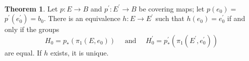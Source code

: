 \documentclass[12pt,a4paper]{book}
\newenvironment{prooff}{{\noindent\it\textcolor{cyan!40!black}{Proof}:}\,}{\par}
\theoremstyle{definition}
\newtheorem{theo}[defn]{Theorem}
\begin{document}
\begin{prooff}



\end{prooff}
\begin{theo}
    Let $p: E \rightarrow B$ and $p^{\prime}: E^{\prime} \rightarrow B$ be covering maps; let $p\left(e_0\right)=$ $p^{\prime}\left(e_0^{\prime}\right)=b_0$. There is an equivalence $h: E \rightarrow E^{\prime}$ such that $h\left(e_0\right)=e_0^{\prime}$ if and only if the groups
    \begin{equation*}
        H_0=p_*\left(\pi_1\left(E, e_0\right)\right) \quad \text { and } \quad H_0^{\prime}=p_*^{\prime}\left(\pi_1\left(E^{\prime}, e_0^{\prime}\right)\right)
    \end{equation*}
    are equal. If $h$ exists, it is unique.
\end{theo}
\end{document}
